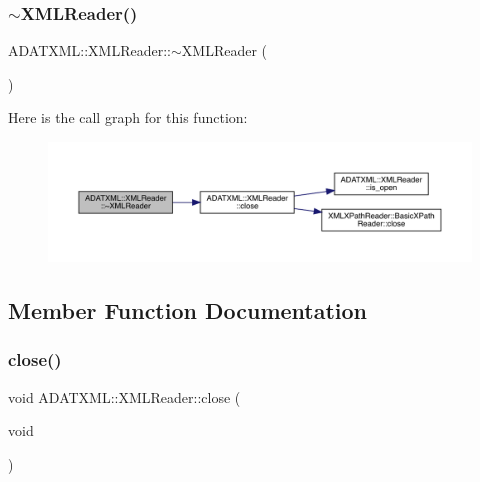 \subsubsection{\texorpdfstring{$\sim$XMLReader()}{~XMLReader()}\hspace{0.1cm}{\footnotesize\ttfamily [2/2]}}
{\footnotesize\ttfamily A\+D\+A\+T\+X\+M\+L\+::\+X\+M\+L\+Reader\+::$\sim$\+X\+M\+L\+Reader (\begin{DoxyParamCaption}{ }\end{DoxyParamCaption})\hspace{0.3cm}{\ttfamily [inline]}}

Here is the call graph for this function\+:
\nopagebreak
\begin{figure}[H]
\begin{center}
\leavevmode
\includegraphics[width=350pt]{db/d3f/classADATXML_1_1XMLReader_a98c4936a3366f39443113290b7bd164a_cgraph}
\end{center}
\end{figure}


\subsection{Member Function Documentation}
\mbox{\label{classADATXML_1_1XMLReader_a0e5f84d85bb03e1ba3c01a20b1642a36}} 
\subsubsection{\texorpdfstring{close()}{close()}\hspace{0.1cm}{\footnotesize\ttfamily [1/2]}}
{\footnotesize\ttfamily void A\+D\+A\+T\+X\+M\+L\+::\+X\+M\+L\+Reader\+::close (\begin{DoxyParamCaption}\item[{void}]{ }\end{DoxyParamCaption})\hspace{0.3cm}{\ttfamily [inline]}}



